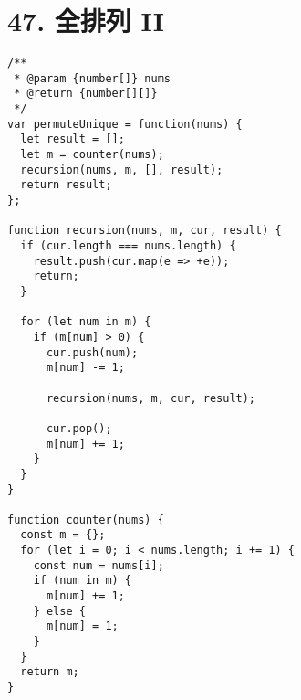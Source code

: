 \newpage
\section{47. 全排列 II}
\label{leetcode:47}

\begin{verbatim}
/**
 * @param {number[]} nums
 * @return {number[][]}
 */
var permuteUnique = function(nums) {
  let result = [];
  let m = counter(nums);
  recursion(nums, m, [], result);
  return result;
};

function recursion(nums, m, cur, result) {
  if (cur.length === nums.length) {
    result.push(cur.map(e => +e));
    return;
  }

  for (let num in m) {
    if (m[num] > 0) {
      cur.push(num);
      m[num] -= 1;

      recursion(nums, m, cur, result);

      cur.pop();
      m[num] += 1;
    }
  }
}

function counter(nums) {
  const m = {};
  for (let i = 0; i < nums.length; i += 1) {
    const num = nums[i];
    if (num in m) {
      m[num] += 1;
    } else {
      m[num] = 1;
    }
  }
  return m;
}
\end{verbatim}
